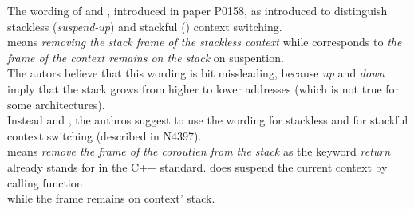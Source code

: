 The wording of \susup and \susdown, introduced in paper P0158\cite{P0158}, as
introduced to distinguish stackless (\emph{suspend-up}) and stackful (\susdown)
context switching.\\
\susup means \emph{removing the stack frame of the stackless context} while
\susdown corresponds to \emph{the frame of the context remains on the stack} on
suspention.\\
The autors believe that this wording is bit missleading, because \emph{up} and
\emph{down} imply that the stack grows from higher to lower addresses (which is
not true for some architectures).\\
\newline
Instead \susup and \susdown, the authros suggest to use the wording \susreturn for
stackless and \suscall for stackful context switching (described in
N4397\cite{N4397}).\\
\susreturn means \emph{remove the frame of the coroutien from the stack} as the
keyword \emph{return} already stands for in the C++ standard. \suscall does
suspend the current context by calling function\\
 while the frame remains on
context' stack.
